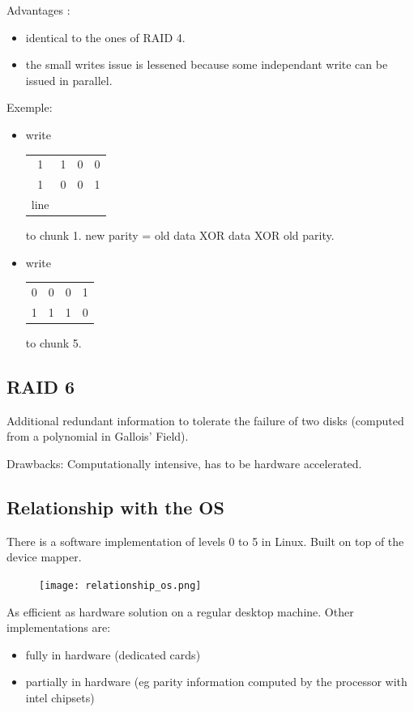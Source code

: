 \documentclass[a4paper,10pt]{report}
\begin{document}
Advantages :

\begin{itemize}
  \item identical to the ones of RAID 4.
  \item the small writes issue is lessened because some independant write can be issued in parallel.
\end{itemize}

Exemple:

\begin{itemize}
  \item write
      \begin{tabular}{|cccc|}
      \hline
         1&1&0&0 \\
         1&0&0&1 \\
    line
      \end{tabular}
to chunk 1. new parity = old data XOR data XOR old parity.

\item write
      \begin{tabular}{|cccc|}
      \hline
         0&0&0&1 \\
         1&1&1&0 \\
      \hline
      \end{tabular}
to chunk 5. 
\end{itemize}

\subsection{RAID 6}

Additional redundant information to tolerate the failure of two disks (computed from a polynomial in Gallois' Field).

Drawbacks: Computationally intensive, has to be hardware accelerated.

\subsection{Relationship with the OS}

There is a software implementation of levels 0 to 5 in Linux.
Built on top of the device mapper.

\begin{figure}[h!]
  \begin{center}
    \texttt{[image: relationship\_os.png]}
    \caption{}
  \end{center}
\end{figure}

As efficient as hardware solution on a regular desktop machine.
Other implementations are:

\begin{itemize}
  \item fully in hardware (dedicated cards)
  \item partially in hardware (eg parity information computed by the processor with intel chipsets)
\end{itemize}
\end{document}
